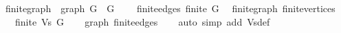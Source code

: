 \begin{isabellebody}
\endisatagproof
{\isafoldproof}%
%
\isadelimproof
\isanewline
%
\endisadelimproof
\isanewline
{}\isamarkupfalse%
\ finite{\isacharunderscore}{\kern0pt}graph\ {\isacharequal}{\kern0pt}\ graph\ G\ \ G\ {\isacharplus}{\kern0pt}\isanewline
\ \ \ finite{\isacharunderscore}{\kern0pt}edges{\isacharcolon}{\kern0pt}\ {\isachardoublequoteopen}finite\ G{\isachardoublequoteclose}\isanewline
\isanewline
{}\isamarkupfalse%
\ {\isacharparenleft}{\kern0pt}\ finite{\isacharunderscore}{\kern0pt}graph{\isacharparenright}{\kern0pt}\ finite{\isacharunderscore}{\kern0pt}vertices{\isacharcolon}{\kern0pt}\isanewline
\ \ \ {\isachardoublequoteopen}finite\ {\isacharparenleft}{\kern0pt}Vs\ G{\isacharparenright}{\kern0pt}{\isachardoublequoteclose}\isanewline
%
\isadelimproof
\ \ %
\endisadelimproof
%
\isatagproof
{}\isamarkupfalse%
\ graph\ finite{\isacharunderscore}{\kern0pt}edges\isanewline
\ \ \isamarkupfalse%
\ {\isacharparenleft}{\kern0pt}auto\ simp\ add{\isacharcolon}{\kern0pt}\ Vs{\isacharunderscore}{\kern0pt}def{\isacharparenright}{\kern0pt}%
\endisatagproof
{\isafoldproof}%
%
\isadelimproof
\isanewline
%
\endisadelimproof
%
\isadelimtheory
\isanewline
%
\endisadelimtheory
%
\isatagtheory
{}\isamarkupfalse%
%
\endisatagtheory
{\isafoldtheory}%
%
\isadelimtheory
%
\endisadelimtheory
%
\end{isabellebody}%
\endinput

